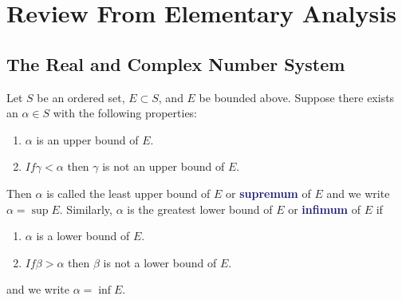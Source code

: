 \documentclass[11pt]{article}
\numberwithin{equation}{section}
\newcommand{\navy}[1]{\textcolor{MidnightBlue}{\bf #1}}
\theoremstyle{definition}
\theoremstyle{definition}
\newcommand{\1}{\mathbbm 1}
\begin{document}
\appendix

\section{Review From Elementary Analysis}

\subsection{The Real and Complex Number System}

\begin{definition}
	Let $S$ be an ordered set, $E \subset S$, and $E$ be bounded above. Suppose there exists an $\alpha \in S$ with the following properties:
	\begin{enumerate}
		\item $\alpha$ is an upper bound of $E$.
		\item $If \gamma < \alpha$ then $\gamma$ is not an upper bound of $E$.
	\end{enumerate}
	Then $\alpha$ is called the least upper bound of $E$ or \navy{supremum} of $E$ and we write $\alpha = \sup E$. Similarly, $\alpha$ is the greatest lower bound of $E$ or \navy{infimum} of $E$ if 
	\begin{enumerate}
		\item $\alpha$ is a lower bound of $E$.
		\item $If \beta > \alpha$ then $\beta$ is not a lower bound of $E$.
	\end{enumerate}
	and we write $\alpha = \inf E$.
\end{definition}
\end{document}
